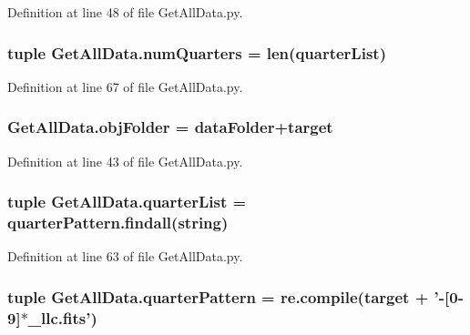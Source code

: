Definition at line 48 of file Get\-All\-Data.\-py.

\hypertarget{namespace_get_all_data_abb46709e621fe2edfea6055c1749afd5}{
\subsubsection[{num\-Quarters}]{\setlength{\rightskip}{0pt plus 5cm}tuple Get\-All\-Data.\-num\-Quarters = len({\bf quarter\-List})}}\label{namespace_get_all_data_abb46709e621fe2edfea6055c1749afd5}


Definition at line 67 of file Get\-All\-Data.\-py.

\hypertarget{namespace_get_all_data_ad1a3a2da71089668ef951488bd43ec72}{
\subsubsection[{obj\-Folder}]{\setlength{\rightskip}{0pt plus 5cm}Get\-All\-Data.\-obj\-Folder = {\bf data\-Folder}+{\bf target}}}\label{namespace_get_all_data_ad1a3a2da71089668ef951488bd43ec72}


Definition at line 43 of file Get\-All\-Data.\-py.

\hypertarget{namespace_get_all_data_a05b955962336cb4b084d9ebadce6bebc}{
\subsubsection[{quarter\-List}]{\setlength{\rightskip}{0pt plus 5cm}tuple Get\-All\-Data.\-quarter\-List = quarter\-Pattern.\-findall({\bf string})}}\label{namespace_get_all_data_a05b955962336cb4b084d9ebadce6bebc}


Definition at line 63 of file Get\-All\-Data.\-py.

\hypertarget{namespace_get_all_data_a826165aca23510d517a06f85902411be}{
\subsubsection[{quarter\-Pattern}]{\setlength{\rightskip}{0pt plus 5cm}tuple Get\-All\-Data.\-quarter\-Pattern = re.\-compile({\bf target} + '-\/\mbox{[}0-\/9\mbox{]}$\ast$\-\_\-llc.\-fits')}}\label{namespace_get_all_data_a826165aca23510d517a06f85902411be}


